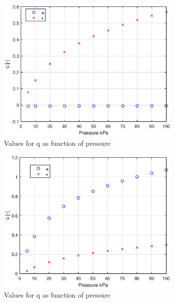 \begin{figure}[H]
    \centering
    \includegraphics[width = 0.8\textwidth]{ProgressOverview/elongq.eps}
    \caption{Values for q as function of pressure}
    \label{fig:elongq}
\end{figure}


\begin{figure}[H]
    \centering
    \includegraphics[width = 0.8\textwidth]{ProgressOverview/rotq.eps}
    \caption{Values for q as function of pressure}
    \label{fig:rotq}
\end{figure}
